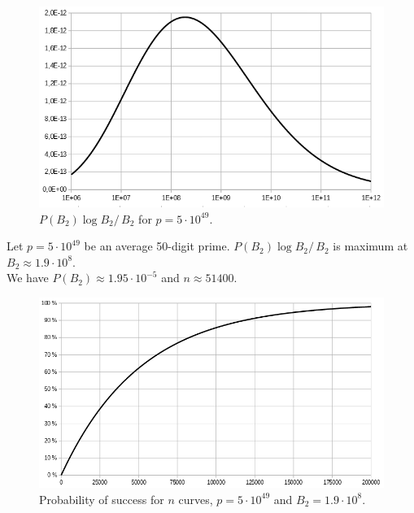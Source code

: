 \documentclass[a4paper, 11pt, pdftex]{report}
\theoremstyle{plain}
\theoremstyle{definition}
\begin{document}
\begin{figure}[!h]
	\centering
	\includegraphics[width=15.5cm, angle=0]{img/cond_max.png}
	\caption{\label{fig:max} $P(B_2) \log B_2 /\, B_2$ for $p = 5\cdot10^{49}$.}
\end{figure}

Let $p = 5\cdot10^{49}$ be an average 50-digit prime.
$P(B_2) \log B_2 /\, B_2$ is maximum at $B_2 \approx 1.9\cdot 10^8$.\\
We have $P(B_2) \approx 1.95\cdot 10^{-5}$ and $n \approx 51400$.

\begin{figure}[!ht]
	\centering
	\includegraphics[width=15.5cm, angle=0]{img/n_curves.png}
	\caption{\label{fig:p_n} Probability of success for $n$ curves, $p = 5\cdot10^{49}$ and $B_2 = 1.9\cdot 10^8$.}
\end{figure}
\end{document}
